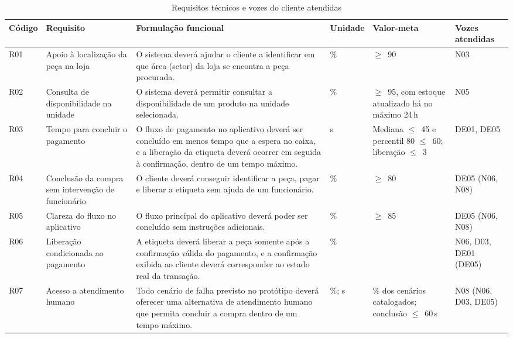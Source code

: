 \begin{table}[htbp]
    \centering
    \caption{Requisitos técnicos e vozes do cliente atendidas}
    \label{tab:requisitos}
    \footnotesize
    \renewcommand{\arraystretch}{1.3}
    \begin{tabularx}{\textwidth}{@{}
        >{\RaggedRight\arraybackslash}p{1.2cm}
        >{\RaggedRight\arraybackslash}p{2.5cm}
        >{\RaggedRight\arraybackslash}X
        >{\RaggedRight\arraybackslash}p{1.3cm}
        >{\RaggedRight\arraybackslash}p{3.0cm}
        >{\RaggedRight\arraybackslash}p{1.9cm}@{}}
        \toprule
        \textbf{Código} & \textbf{Requisito} & \textbf{Formulação funcional} & \textbf{Unidade} & \textbf{Valor-meta} & \textbf{Vozes atendidas} \\
        \midrule
        R01 & Apoio à localização da peça na loja
            & O sistema deverá ajudar o cliente a identificar em que área (setor) da loja se encontra a peça procurada.
            & \% & $\geq$~90 & N03 \\
        \addlinespace
        R02 & Consulta de disponibilidade na unidade
            & O sistema deverá permitir consultar a disponibilidade de um produto na unidade selecionada.
            & \% & $\geq$~95, com estoque atualizado há no máximo 24\,h & N05 \\
        \addlinespace
        R03 & Tempo para concluir o pagamento
            & O fluxo de pagamento no aplicativo deverá ser concluído em menos tempo que a espera no caixa, e a liberação da etiqueta deverá ocorrer em seguida à confirmação, dentro de um tempo máximo.
            & s & Mediana $\leq$~45 e percentil 80 $\leq$~60; liberação $\leq$~3 & DE01, DE05 \\
        \addlinespace
        R04 & Conclusão da compra sem intervenção de funcionário
            & O cliente deverá conseguir identificar a peça, pagar e liberar a etiqueta sem ajuda de um funcionário.
            & \% & $\geq$~80 & DE05 (N06, N08) \\
        \addlinespace
        R05 & Clareza do fluxo no aplicativo
            & O fluxo principal do aplicativo deverá poder ser concluído sem instruções adicionais.
            & \% & $\geq$~85 & DE05 (N06, N08) \\
        \addlinespace
        R06 & Liberação condicionada ao pagamento
            & A etiqueta deverá liberar a peça somente após a confirmação válida do pagamento, e a confirmação exibida ao cliente deverá corresponder ao estado real da transação.
            & \% & 100 & N06, D03, DE01 (DE05) \\
        \addlinespace
        R07 & Acesso a atendimento humano
            & Todo cenário de falha previsto no protótipo deverá oferecer uma alternativa de atendimento humano que permita concluir a compra dentro de um tempo máximo.
            & \%; s & 100\% dos cenários catalogados; conclusão $\leq$~60\,s & N08 (N06, D03, DE05) \\
        \bottomrule
    \end{tabularx}
\end{table}

